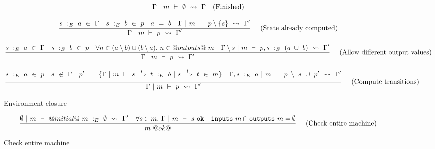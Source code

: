 \begin{figure*}

$$
\Gamma ~|~ m ~\vdash~ \emptyset ~\rightsquigarrow~ \Gamma
\quad
\textrm{(Finished)}
$$

$$
\frac {\displaystyle 
    s~:_E~ a ~\in~ \Gamma
    \quad
    s~:_E~b~\in~p
    \quad
    a~=~b
    \quad
    \Gamma ~|~ m ~\vdash~ p \setminus \{s\} ~\rightsquigarrow~ \Gamma'
} {\displaystyle 
    \Gamma ~|~ m ~\vdash~ p ~\rightsquigarrow~ \Gamma'
} \ 
\quad
\textrm{(State already computed)}
$$

$$
\frac {\displaystyle 
    s~:_E~ a ~\in~ \Gamma
    \quad
    s~:_E~b~\in~p
    \quad
    \forall n \in (a \setminus b) \cup (b \setminus a).~ n \in @outputs@~m
    \quad
    \Gamma \setminus s ~|~ m ~\vdash~ p, s~:_E~(a~\cup~b) ~\rightsquigarrow~ \Gamma'
} {\displaystyle 
    \Gamma ~|~ m ~\vdash~ p ~\rightsquigarrow~ \Gamma'
} \ 
\quad
\textrm{(Allow different output values)}
$$

$$
\frac {\displaystyle 
    s~:_E~a~\in~p
    \quad
    s~\not\in~\Gamma
    \quad
    p'~=~\{ \Gamma ~|~ m ~\vdash~ s~\xRightarrow{l}~t ~:_E~ b ~|~ s~\xRightarrow{l}~ t~\in~ m\}
    \quad
    \Gamma,s~:_E~a ~|~ m ~\vdash~ p~\setminus~s~\cup~ p'  ~\rightsquigarrow~ \Gamma'
} {\displaystyle 
    \Gamma ~|~ m ~\vdash~ p ~\rightsquigarrow~ \Gamma'
} \ 
\quad
\textrm{(Compute transitions)}
$$

\caption{Environment closure}
\label{fig:inv:closure}
\end{figure*}


\begin{figure*}

$$
\frac {\displaystyle 
    \emptyset ~|~ m ~\vdash~ @initial@~m~:_E~\emptyset ~\rightsquigarrow~ \Gamma'
    \quad
    \forall s \in m.\ \Gamma ~|~ m ~\vdash~ s~\mathtt{ok}
    \quad
    \mathtt{inputs}~m \cap \mathtt{outputs}~m = \emptyset
} {\displaystyle 
    m~@ok@
} \ 
\quad
\textrm{(Check entire machine)}
$$


\caption{Check entire machine}
\label{fig:inv:entire}
\end{figure*}
